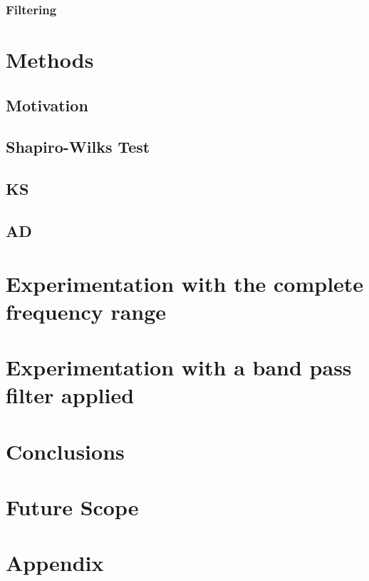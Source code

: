 \documentclass[12pt]{article}
\begin{document}
\subsubsection{Filtering}

\section{Methods}\label{Methods}
\subsection{Motivation}
\subsection{Shapiro-Wilks Test}
\subsection{KS}
\subsection{AD}
\section{Experimentation with the complete frequency range}\label{Experiment_1}
\section{Experimentation with a band pass filter applied}\label{Experiment_2}


\section{Conclusions}\label{Conclusions}

\section{Future Scope}\label{Future Scope}

\section{Appendix}\label{Appendix}



\end{document}
